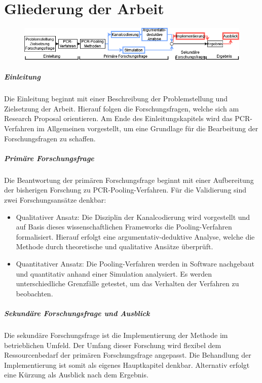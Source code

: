
\chapter{Gliederung der Arbeit}
\begin{figure}[h]
	\centering
	\includegraphics[height=.15\textwidth]{images/Untitled Diagram.drawio}
\end{figure}

\paragraph{Einleitung}
Die Einleitung beginnt mit einer Beschreibung der Problemstellung und Zielsetzung der Arbeit.
Hierauf folgen die Forschungsfragen, welche sich am Research Proposal orientieren.
Am Ende des Einleitungskapitels wird das PCR-Verfahren im Allgemeinen vorgestellt, um eine Grundlage für die Bearbeitung der Forschungsfragen zu schaffen.

\paragraph{Primäre Forschungsfrage}
Die Beantwortung der primären Forschungsfrage beginnt mit einer Aufbereitung der bisherigen Forschung zu PCR-Pooling-Verfahren.
Für die Validierung sind zwei Forschungsansätze denkbar:
\begin{itemize}
	\setlength{\itemsep}{-8pt}
	\item Qualitativer Ansatz:
				Die Disziplin der Kanalcodierung wird vorgestellt und auf Basis dieses wissenschaftlichen Frameworks die Pooling-Verfahren formalisiert.
				Hierauf erfolgt eine argumentativ-deduktive Analyse, welche die Methode durch theoretische und qualitative Ansätze überprüft.
	\item Quantitativer Ansatz:
				Die Pooling-Verfahren werden in Software nachgebaut und quantitativ anhand einer Simulation analysiert.
				Es werden unterschiedliche Grenzfälle getestet, um das Verhalten der Verfahren zu beobachten.
\end{itemize}

\paragraph{Sekundäre Forschungsfrage und Ausblick}
Die sekundäre Forschungsfrage ist die Implementierung der Methode im betrieblichen Umfeld.
Der Umfang dieser Forschung wird flexibel dem Ressourcenbedarf der primären Forschungsfrage angepasst.
Die Behandlung der Implementierung ist somit als eigenes Hauptkapitel denkbar.
Alternativ erfolgt eine Kürzung als Ausblick nach dem Ergebnis.

